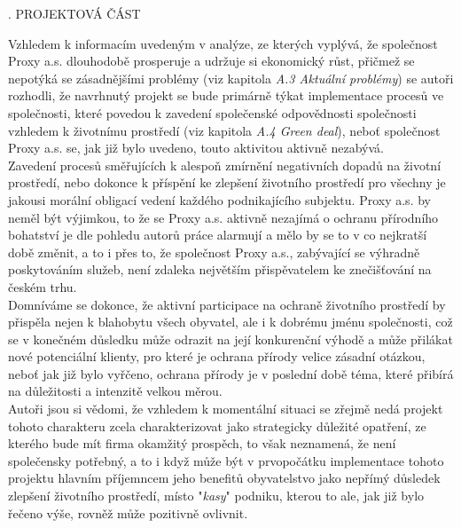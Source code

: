 \newcommand\ProjektovaCast{\texorpdfstring{\MakeUppercase{}.}{} PROJEKTOVÁ ČÁST}
\begin{lefttextpipe}
	{\Large \ProjektovaCast}
\end{lefttextpipe}
\addcontentsline{toc}{section}{\ProjektovaCast}

Vzhledem k informacím uvedeným v analýze, ze kterých vyplývá, že společnost Proxy a.s. dlouhodobě prosperuje a udržuje si ekonomický růst, přičmež se nepotýká se zásadnějšími problémy (viz kapitola \textit{A.3 Aktuální problémy}) se autoři rozhodli, že navrhnutý projekt se bude primárně týkat implementace procesů ve společnosti, které povedou k zavedení společenské odpovědnosti společnosti vzhledem k životnímu prostředí (viz kapitola \textit{A.4 Green deal}), neboť společnost Proxy a.s. se, jak již bylo uvedeno, touto aktivitou aktivně nezabývá.\\

Zavedení procesů směřujících k alespoň zmírnění negativních dopadů na životní prostředí, nebo dokonce k příspění ke zlepšení životního prostředí pro všechny je jakousi morální obligací vedení každého podnikajícího subjektu. Proxy a.s. by neměl být výjimkou, to že se Proxy a.s. aktivně nezajímá o ochranu přírodního bohatství je dle pohledu autorů práce alarmují a mělo by se to v co nejkratší době změnit, a to i přes to, že společnost Proxy a.s., zabývající se výhradně poskytováním služeb, není zdaleka největším přispěvatelem ke znečišťování na českém trhu.\\

Domníváme se dokonce, že aktivní participace na ochraně životního prostředí by přispěla nejen k blahobytu všech obyvatel, ale i k dobrému jménu společnosti, což se v konečném důsledku může odrazit na její konkurenční výhodě a může přilákat nové potenciální klienty, pro které je ochrana přírody velice zásadní otázkou, neboť jak již bylo vyřčeno, ochrana přírody je v poslední době téma, které přibírá na důležitosti a intenzitě velkou měrou.\\

Autoři jsou si vědomi, že vzhledem k momentální situaci se zřejmě nedá projekt tohoto charakteru zcela charakterizovat jako strategicky důležité opatření, ze kterého bude mít firma okamžitý prospěch, to však neznamená, že není společensky potřebný, a to i když může být v prvopočátku implementace tohoto projektu hlavním příjemncem jeho benefitů obyvatelstvo jako nepřímý důsledek zlepšení životního prostředí, místo "\textit{kasy}" podniku, kterou to ale, jak již bylo řečeno výše, rovněž může pozitivně ovlivnit.\\

